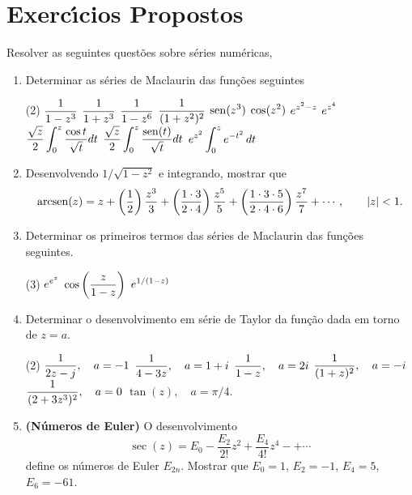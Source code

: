 \section*{Exerc\'{\i}cios Propostos} 
Resolver as seguintes quest\~{o}es sobre s\'{e}ries num\'{e}ricas,
\begin{enumerate}[label=\rm{(\arabic*)}]
\item  Determinar as s\'{e}ries de Maclaurin das fun\c{c}\~{o}es seguintes
\begin{tasks}[label=\rm{(\alph*)},item-indent=3em,label-width=4ex,ref=\rm{(\alph*)}](2)
\task  \(\displaystyle{\dfrac{1}{1-z^3}}\)
\task  \(\displaystyle{\dfrac{1}{1+z^3}}\)
\task \(\displaystyle{\dfrac{1}{1-z^6}}\)
\task  \(\displaystyle{\dfrac{1}{(1+z^2)^2}}\)
\task  \(\displaystyle{\operatorname{sen}(z^3)}\)
\task  \(\displaystyle{\cos(z^2)}\)
\task  \(\displaystyle{e^{z^2-z}}\)
\task  \(\displaystyle{e^{z^4}}\)
\task  \(\displaystyle{\dfrac{\sqrt{z}}{2}\int_0^z\frac{\cos t}{\sqrt{t}}dt}\)
\task  \(\displaystyle{\dfrac{\sqrt{z}}{2}\int_0^z\frac{\operatorname{sen}(t)}{\sqrt{t}}dt}\)
\task \(\displaystyle{e^{z^2}\int_0^ze^{-t^2}\,dt}\)
\end{tasks}

\item Desenvolvendo $1/\sqrt{1-z^2}$ e integrando, mostrar que
\begin{equation*}
\operatorname{arcsen}(z) = z + \left(\frac{1}{2}\right) \frac{z^3}{3}+
\left(\frac{1\cdot 3}{2\cdot 4 }\right)\frac{z^5}{5}+
\left(\frac{1\cdot 3\cdot 5}{2\cdot 4\cdot
6}\right)\frac{z^7}{7}+\cdots,\qquad |z|<1.
\end{equation*}
\item  Determinar os primeiros termos das s\'{e}ries de Maclaurin das fun\c{c}\~{o}es seguintes.
\begin{tasks}[label=\rm{(\alph*)},item-indent=3em,label-width=4ex,ref=\rm{(\alph*)}](3)
\task \(\displaystyle{e^{e^z}}\)
\task  \(\displaystyle{\cos \left(\frac{z}{1-z}\right)}\)
\task  \(\displaystyle{e^{1/(1-z)}}\)
\end{tasks}
\item Determinar o desenvolvimento em s\'{e}rie de Taylor da fun\c{c}\~{a}o dada
em torno de $z=a$.
\begin{tasks}[label=\rm{(\alph*)},item-indent=3em,label-width=4ex,ref=\rm{(\alph*)}](2)
\task  \(\displaystyle{\frac{1}{2z-j}},\quad a=-1\)
\task \(\displaystyle{\frac{1}{4-3z}},\quad  a=1+i\)
\task  \(\displaystyle{\frac{1}{1-z}},\quad a=2i\)
\task  \(\displaystyle{\frac{1}{(1+z)^2}},\quad a=-i\)
\task  \(\displaystyle{\frac{1}{(2+3z^3)^2}},\quad a=0 \)
\task  \(\tan(z),\quad a=\pi/4.\)
\end{tasks}
\item \textbf{(N\'{u}meros de Euler)} O desenvolvimento
\begin{equation*}
\sec(z) = E_{0}- \dfrac{E_2}{2!} z^2 + \dfrac{E_4}{4!}z^4 - +\cdots
\end{equation*}
define os n\'{u}meros de Euler $E_{2n}$. Mostrar que $E_{0} = 1$, $E_2=-
1$, $E_4 = 5$, $E_6=-61$.
\end{enumerate}

